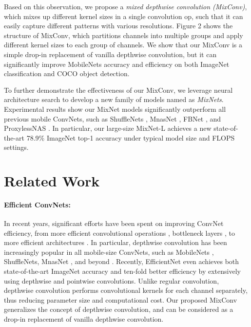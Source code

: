 \documentclass{sty/bmvc2k}
\begin{document}
Based on this observation, we propose a \emph{mixed depthwise convolution (MixConv)}, which mixes up different kernel sizes in a single convolution op, such that it can easily capture different patterns with various resolutions. Figure 2 shows the structure of MixConv, which partitions channels into multiple groups and apply different kernel sizes to each group of channels. We show that our MixConv is a simple drop-in replacement of vanilla depthwise convolution, but it can significantly improve MobileNets accuracy and efficiency on both ImageNet classification and COCO object detection.

To further demonstrate the effectiveness of our MixConv, we leverage neural architecture search \cite{mnas19} to develop a new family of models named as \emph{MixNets}. Experimental results show our MixNet models significantly outperform all previous mobile ConvNets, such as ShuffleNets \cite{shufflenetv218,shufflenet17}, MnasNet \cite{mnas19}, FBNet \cite{fbnet19}, and ProxylessNAS \cite{proxyless19}. In particular, our large-size MixNet-L achieves a new state-of-the-art 78.9\% ImageNet top-1 accuracy under typical model size and FLOPS settings. \section{Related Work}
\label{sec:related}   

\paragraph{Efficient ConvNets:} In recent years, significant efforts have been spent on improving ConvNet efficiency, from more efficient convolutional operations \cite{squeezenet16,mobilenetv117, xception17}, bottleneck layers \cite{mobilenetv218,resnext17}, to more efficient  architectures \cite{mnas19,fbnet19,proxyless19}. In particular, depthwise convolution has been increasingly popular in all mobile-size ConvNets, such as MobileNets \cite{mobilenetv117,mobilenetv218}, ShuffleNets\cite{shufflenet17,shufflenetv218}, MnasNet \cite{mnas19}, and beyond \cite{xception17,nas_imagenet18,amoebanets18}. Recently, EfficientNet \cite{efficientnet19} even achieves both state-of-the-art ImageNet accuracy and ten-fold better efficiency by extensively using depthwise and pointwise convolutions. Unlike regular convolution, depthwise convolution  performs convolutional kernels for each channel separately, thus reducing parameter size and computational cost. Our proposed MixConv generalizes the concept of depthwise convolution, and can be considered as a drop-in replacement of vanilla depthwise convolution. 
\end{document}
